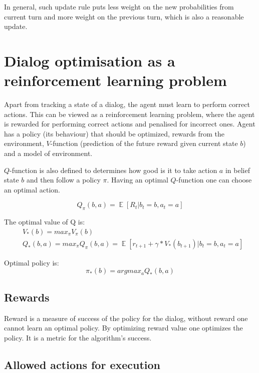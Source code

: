 \documentclass[12pt,titlepage,a4paper]{article}
\DeclareMathOperator*{\E}{\mathbb{E}}
\begin{document}
In general, such update rule puts less weight on the new probabilities from current turn and more weight on the previous turn, which is also a reasonable update. 

\newpage

\section{Dialog optimisation as a reinforcement learning problem}
Apart from tracking a state of a dialog, the agent must learn to perform correct actions. This can be viewed as a reinforcement learning problem, where the agent is rewarded for performing correct actions and penalised for incorrect ones. Agent has a policy (its behaviour) that should be optimized, rewards from the environment, $V$-function (prediction of the future reward given current state $b$) and a model of environment.

$Q$-function is also defined to determines how good is it to take action $a$ in belief state $b$ and then follow a policy $\pi$. Having an optimal $Q$-function one can choose an optimal action.

\begin{equation}
    Q_{\pi}(b, a) = \E[R_t| b_t = b, a_t = a]
\end{equation}

The optimal value of Q is:
\begin{align}
    &V_{*}(b) = max_{\pi}V_{\pi}(b) \\
    &Q_{*}(b, a) = max_{\pi}Q_{\pi}(b, a) = \E[r_{t+1} + \gamma * V_{*}(b_{t+1})| b_t = b, a_t = a]
\end{align}

Optimal policy is: 
\begin{equation}
    \pi_{*}(b) = argmax_{a} Q_{*}(b, a)
\end{equation}


\subsection{Rewards}
Reward is a measure of success of the policy for the dialog, without reward one cannot learn an optimal policy. By optimizing reward value one opti\-mizes the policy. It is a metric for the algorithm's success.

\subsection{Allowed actions for execution}
\end{document}
